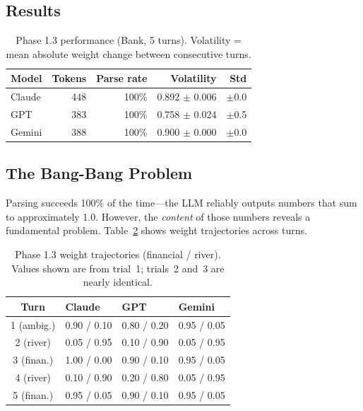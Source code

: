 \documentclass[11pt,a4paper]{article}
\begin{document}
\subsection{Results}

\begin{table}[ht]
\centering
\begin{tabular}{lrrrr}
\toprule
\textbf{Model} & \textbf{Tokens} & \textbf{Parse rate} & \textbf{Volatility} & \textbf{Std} \\
\midrule
Claude & 448 & 100\% & 0.892 $\pm$ 0.006 & $\pm$0.0 \\
GPT & 383 & 100\% & 0.758 $\pm$ 0.024 & $\pm$0.5 \\
Gemini & 388 & 100\% & 0.900 $\pm$ 0.000 & $\pm$0.0 \\
\bottomrule
\end{tabular}
\caption{Phase 1.3 performance (Bank, 5 turns). Volatility = mean absolute weight
change between consecutive turns.}
\label{tab:phase1_3}
\end{table}

\subsection{The Bang-Bang Problem}

Parsing succeeds 100\% of the time---the LLM reliably outputs numbers that sum
to approximately 1.0. However, the \textit{content} of those numbers reveals a
fundamental problem. Table~\ref{tab:phase1_3_weights} shows weight trajectories
across turns.

\begin{table}[ht]
\centering
\begin{tabular}{clll}
\toprule
\textbf{Turn} & \textbf{Claude} & \textbf{GPT} & \textbf{Gemini} \\
\midrule
1 (ambig.) & 0.90 / 0.10 & 0.80 / 0.20 & 0.95 / 0.05 \\
2 (river) & 0.05 / 0.95 & 0.10 / 0.90 & 0.05 / 0.95 \\
3 (finan.) & 1.00 / 0.00 & 0.90 / 0.10 & 0.95 / 0.05 \\
4 (river) & 0.10 / 0.90 & 0.20 / 0.80 & 0.05 / 0.95 \\
5 (finan.) & 0.95 / 0.05 & 0.90 / 0.10 & 0.95 / 0.05 \\
\bottomrule
\end{tabular}
\caption{Phase 1.3 weight trajectories (financial / river). Values shown are
from trial~1; trials~2 and~3 are nearly identical.}
\label{tab:phase1_3_weights}
\end{table}
\end{document}
